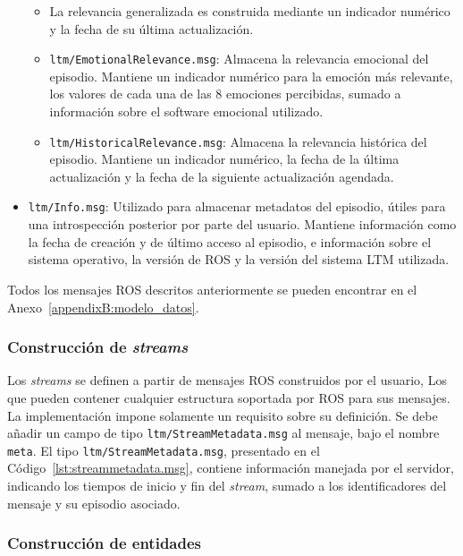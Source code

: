 \begin{itemize}
\begin{itemize}
\item La relevancia generalizada es construida mediante un indicador numérico y la fecha de su última actualización.
\item \texttt{ltm/EmotionalRelevance.msg}: Almacena la relevancia emocional del episodio. Mantiene un indicador numérico para la emoción más relevante, los valores de cada una de las 8 emociones percibidas, sumado a información sobre el software emocional utilizado.
\item \texttt{ltm/HistoricalRelevance.msg}: Almacena la relevancia histórica del episodio. Mantiene un indicador numérico, la fecha de la última actualización y la fecha de la siguiente actualización agendada.
\end{itemize}
\item \texttt{ltm/Info.msg}: Utilizado para almacenar metadatos del episodio, útiles para una introspección posterior por parte del usuario. Mantiene información como la fecha de creación y de último acceso al episodio, e información sobre el sistema operativo, la versión de ROS y la versión del sistema LTM utilizada.
\end{itemize}
 
Todos los mensajes ROS descritos anteriormente se pueden encontrar en el Anexo~\ref{appendixB:modelo_datos}.


\subsubsection{Construcción de \textit{streams}}

Los \textit{streams} se definen a partir de mensajes ROS construidos por el usuario, Los que pueden contener cualquier estructura soportada por ROS para sus mensajes. La implementación impone solamente un requisito sobre su definición. Se debe añadir un campo de tipo \texttt{ltm/StreamMetadata.msg} al mensaje, bajo el nombre \texttt{meta}. El tipo \texttt{ltm/StreamMetadata.msg}, presentado en el Código~\ref{lst:streammetadata.msg}, contiene información manejada por el servidor, indicando los tiempos de inicio y fin del \textit{stream}, sumado a los identificadores del mensaje y su episodio asociado.
\lstset{style=/Style/ROS/MSG}



\subsubsection{Construcción de entidades}

